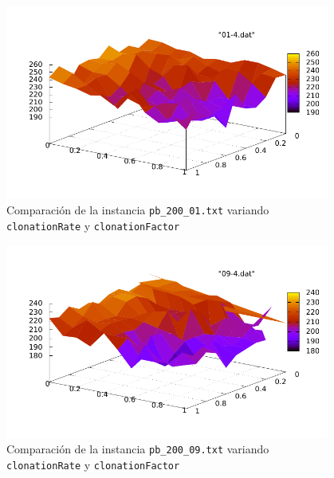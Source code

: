 \begin{figure}[h!]
\begin{center}
	\includegraphics[width=0.95\textwidth]{img/01-4.pdf}
	\caption{Comparaci\'on de la instancia \texttt{pb\_200\_01.txt} variando \texttt{clonationRate} y \texttt{clonationFactor}}
	\label{fig:4-1}
\end{center}
\end{figure}

\begin{figure}[h!]
\begin{center}
	\includegraphics[width=0.95\textwidth]{img/09-4.pdf}
	\caption{Comparaci\'on de la instancia \texttt{pb\_200\_09.txt} variando \texttt{clonationRate} y \texttt{clonationFactor}}
	\label{fig:4-2}
\end{center}
\end{figure}

